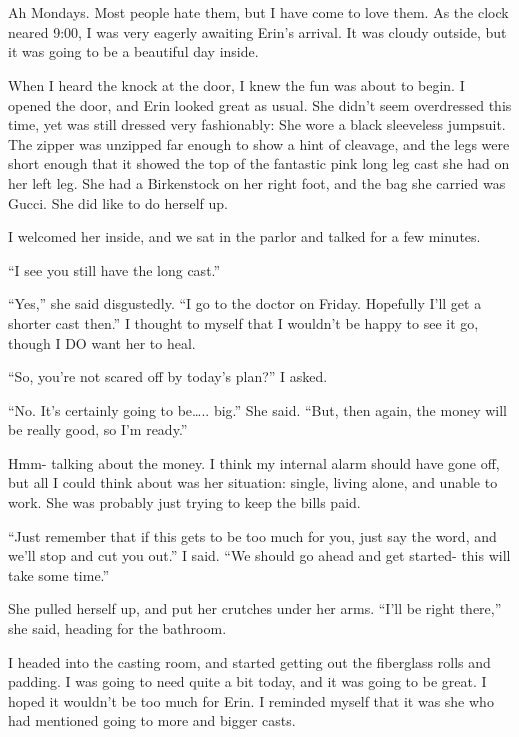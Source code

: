 \chapter{}
Ah Mondays. Most people hate them, but I have come to love them. As the clock neared 9:00,
I was very eagerly awaiting Erin's arrival. It was cloudy outside, but it was going to be a
beautiful day inside.

When I heard the knock at the door, I knew the fun was about to begin. I opened the door,
and Erin looked great as usual. She didn't seem overdressed this time, yet was still dressed
very fashionably: She wore a black sleeveless jumpsuit. The zipper was unzipped far enough to
show a hint of cleavage, and the legs were short enough that it showed the top of the fantastic
pink long leg cast she had on her left leg. She had a Birkenstock on her right foot, and the bag
she carried was Gucci. She did like to do herself up.

I welcomed her inside, and we sat in the parlor and talked for a few minutes.

``I see you still have the long cast.''

``Yes,'' she said disgustedly. ``I go to the doctor on Friday. Hopefully I'll get a
shorter cast then.'' I thought to myself that I wouldn't be happy to see it go, though I DO want
her to heal.

``So, you're not scared off by today's plan?'' I asked.

``No. It's certainly going to be….. big.'' She said. ``But, then again, the money will be
really good, so I'm ready.''

Hmm- talking about the money. I think my internal alarm should have gone off, but all I
could think about was her situation: single, living alone, and unable to work. She was probably
just trying to keep the bills paid.

``Just remember that if this gets to be too much for you, just say the word, and we'll
stop and cut you out.'' I said. ``We should go ahead and get started- this will take some
time.''

She pulled herself up, and put her crutches under her arms. ``I'll be right there,'' she
said, heading for the bathroom.

I headed into the casting room, and started getting out the fiberglass rolls and padding.
I was going to need quite a bit today, and it was going to be great. I hoped it wouldn't be too
much for Erin. I reminded myself that it was she who had mentioned going to more and bigger
casts.

